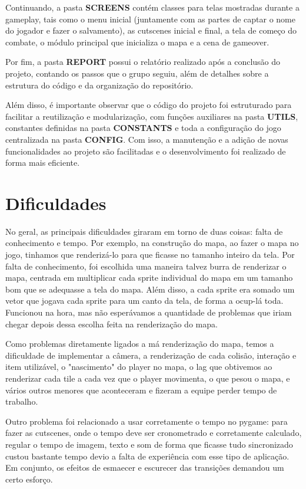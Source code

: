 \documentclass[a4paper, 12pt, twoside]{article}
\begin{document}
Continuando, a pasta \textbf{SCREENS} contém classes para telas mostradas durante a gameplay, tais como o menu inicial (juntamente com as partes de captar o nome do jogador e fazer o salvamento), as cutscenes inicial e final, a tela de começo do combate, o módulo principal que inicializa o mapa e a cena de gameover.

Por fim, a pasta \textbf{REPORT} possui o relatório realizado após a conclusão do projeto, contando os passos que o grupo seguiu, além de detalhes sobre a estrutura do código e da organização do repositório. 

Além disso, é importante observar que o código do projeto foi estruturado para facilitar a reutilização e modularização, com funções auxiliares na pasta \textbf{UTILS}, constantes definidas na pasta \textbf{CONSTANTS} e toda a configuração do jogo centralizada na pasta \textbf{CONFIG}. Com isso, a manutenção e a adição de novas funcionalidades ao projeto são facilitadas e o desenvolvimento foi realizado de forma mais eficiente.

\section{Dificuldades}

No geral, as principais dificuldades giraram em torno de duas coisas: falta de conhecimento e tempo. Por exemplo, na construção do mapa, ao fazer o mapa no jogo, tinhamos que renderizá-lo para que ficasse no tamanho inteiro da tela. Por falta de conhecimento, foi escolhida uma maneira talvez burra de renderizar o mapa, centrada em multiplicar cada sprite individual do mapa em um tamanho bom que se adequasse a tela do mapa. Além disso, a cada sprite era somado um vetor que jogava cada sprite para um canto da tela, de forma a ocup-lá toda. Funcionou na hora, mas não esperávamos a quantidade de problemas que iriam chegar depois dessa escolha feita na renderização do mapa.

Como problemas diretamente ligados a má renderização do mapa, temos a dificuldade de implementar a câmera, a renderização de cada colisão, interação e  item utilizável, o "nascimento" do player no mapa, o lag que obtivemos ao renderizar cada tile a cada vez que o player movimenta, o que pesou o mapa, e vários outros menores que aconteceram e fizeram a equipe perder tempo de trabalho.

Outro problema foi relacionado a usar corretamente o tempo no pygame: para fazer as cutscenes, onde o tempo deve ser cronometrado e corretamente calculado, regular o tempo de imagem, texto e som de forma que ficasse tudo sincronizado custou bastante tempo devio a falta de experiência com esse tipo de aplicação. Em conjunto, os efeitos de esmaecer e escurecer das transições demandou um certo esforço.
\end{document}
